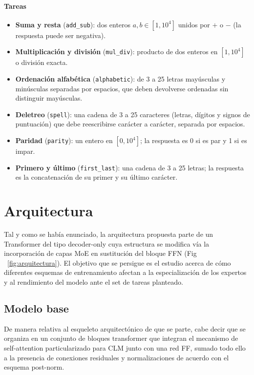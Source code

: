 \documentclass[10pt,twocolumn,a4paper]{article}
\begin{document}
\paragraph{Tareas}
\begin{itemize}[leftmargin=*,nosep]
  \item \textbf{Suma y resta} (\texttt{add\_sub}): dos enteros
    $a, b \in [1, 10^4]$ unidos por $+$ o $-$ (la respuesta puede ser negativa).
  \item \textbf{Multiplicación y división} (\texttt{mul\_div}): producto de
    dos enteros en $[1, 10^4]$ o división exacta.
  \item \textbf{Ordenación alfabética} (\texttt{alphabetic}): de 3 a 25
    letras mayúsculas y minúsculas separadas por espacios, que deben
    devolverse ordenadas sin distinguir mayúsculas.
  \item \textbf{Deletreo} (\texttt{spell}): una cadena de 3 a 25 caracteres
    (letras, dígitos y signos de puntuación) que debe reescribirse carácter a
    carácter, separada por espacios.
  \item \textbf{Paridad} (\texttt{parity}): un entero en $[0, 10^4]$; la
    respuesta es 0 si es par y 1 si es impar.
  \item \textbf{Primero y último} (\texttt{first\_last}): una cadena de 3 a
    25 letras; la respuesta es la concatenación de su primer y su último
    carácter.
\end{itemize}

\section{Arquitectura}
\label{sec:arch}
Tal y como se había enunciado, la arquitectura propuesta parte de un Transformer del tipo decoder-only cuya estructura se modifica vía la incorporación de capas MoE en sustitución del bloque  FFN (Fig ~\ref{fig:arquitectura}). El objetivo que se persigue es el estudio acerca de cómo diferentes esquemas de entrenamiento afectan a la especialización de los expertos y al rendimiento del modelo ante el set de tareas planteado.


\subsection{Modelo base}
\label{sec:base}

De manera relativa al esqueleto arquitectónico de que se parte, cabe decir que se organiza en un conjunto de bloques transformer que integran el mecanismo de self-attention particularizado para CLM junto con una red FF, sumado todo ello a la presencia de  conexiones residuales y normalizaciones  de acuerdo con el esquema post-norm.
\end{document}
